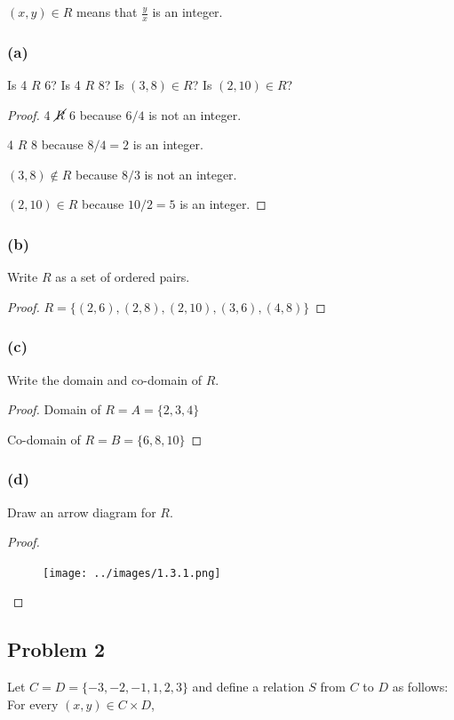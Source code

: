 \documentclass[14pt]{extarticle}
\newcommand{\dps}{\displaystyle}
\begin{document}
\begin{center}
$(x, y) \in R$ means that $\dps\frac{y}{x}$ is an integer.
\end{center}

\subsubsection{(a)}
Is 4 $R$ 6? Is 4 $R$ 8? Is $(3, 8) \in R$? Is $(2, 10) \in R$?

\begin{proof}
4 $\cancel{R}$ 6 because $6 / 4$ is not an integer.

4 $R$ 8 because $8 / 4 = 2$ is an integer.

$(3, 8) \notin R$ because $8 / 3$ is not an integer.

$(2, 10) \in R$ because $10 / 2 = 5$ is an integer.
\end{proof}

\subsubsection{(b)}
Write $R$ as a set of ordered pairs.

\begin{proof}
$R = \{(2, 6), (2, 8), (2, 10), (3, 6), (4, 8)\}$
\end{proof}

\subsubsection{(c)}
Write the domain and co-domain of $R$.

\begin{proof}
Domain of $R = A = \{2, 3, 4\}$

Co-domain of $R = B = \{6, 8, 10\}$
\end{proof}

\subsubsection{(d)}
Draw an arrow diagram for $R$.

\begin{proof}
\begin{figure}[ht!]
\centering
\texttt{[image: ../images/1.3.1.png]}
\end{figure}
\end{proof}

\subsection{Problem 2}
Let $C = D = \{-3, -2, -1, 1, 2, 3\}$ and define a relation $S$ from $C$ to
$D$ as follows: For every $(x, y) \in C \times D$,
\end{document}
